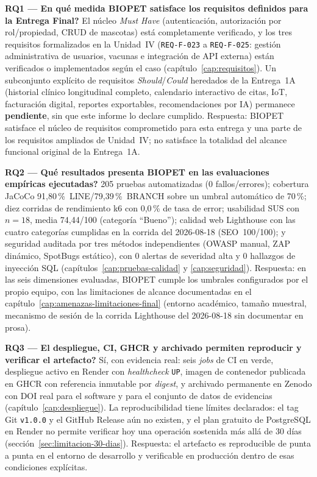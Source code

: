 \textbf{RQ1 --- \textquestiondown En qu\'e medida BIOPET satisface los
requisitos definidos para la Entrega Final?} El n\'ucleo \emph{Must Have}
(autenticaci\'on, autorizaci\'on por rol/propiedad, CRUD de mascotas) est\'a
completamente verificado, y los tres requisitos formalizados en la
Unidad~IV (\texttt{REQ-F-023} a \texttt{REQ-F-025}: gesti\'on
administrativa de usuarios, vacunas e integraci\'on de API externa) est\'an
verificados o implementados seg\'un el caso (cap\'itulo~\ref{cap:requisitos}). Un
subconjunto expl\'icito de requisitos \emph{Should}/\emph{Could} heredados
de la Entrega~1A (historial cl\'inico longitudinal completo, calendario
interactivo de citas, IoT, facturaci\'on digital, reportes exportables,
recomendaciones por IA) permanece \textbf{pendiente}, sin que este informe
lo declare cumplido. Respuesta: BIOPET satisface el n\'ucleo de requisitos
comprometido para esta entrega y una parte de los requisitos ampliados de
Unidad~IV; no satisface la totalidad del alcance funcional original de la
Entrega~1A.

\textbf{RQ2 --- \textquestiondown Qu\'e resultados presenta BIOPET en las
evaluaciones emp\'iricas ejecutadas?} 205 pruebas automatizadas (0
fallos/errores); cobertura JaCoCo 91{,}80\,\%~LINE/79{,}39\,\%~BRANCH sobre
un umbral autom\'atico de 70\,\%; diez corridas de rendimiento k6 con
0{,}0\,\% de tasa de error; usabilidad SUS con $n=18$, media 74{,}44/100
(categor\'ia ``Bueno''); calidad web Lighthouse con las cuatro categor\'ias
cumplidas en la corrida del 2026-08-18 (SEO~100/100); y seguridad auditada
por tres m\'etodos independientes (OWASP manual, ZAP din\'amico, SpotBugs
est\'atico), con 0 alertas de severidad alta y 0 hallazgos de inyecci\'on
SQL (cap\'itulos~\ref{cap:pruebas-calidad} y \ref{cap:seguridad}). Respuesta:
en las seis dimensiones evaluadas, BIOPET cumple los umbrales configurados
por el propio equipo, con las limitaciones de alcance documentadas en el
cap\'itulo~\ref{cap:amenazas-limitaciones-final} (entorno acad\'emico,
tama\~no muestral, mecanismo de sesi\'on de la corrida Lighthouse del
2026-08-18 sin documentar en prosa).

\textbf{RQ3 --- \textquestiondown El despliegue, CI, GHCR y archivado
permiten reproducir y verificar el artefacto?} S\'i, con evidencia real:
seis \emph{jobs} de CI en verde, despliegue activo en Render con
\emph{healthcheck} \texttt{UP}, imagen de contenedor publicada en GHCR con
referencia inmutable por \emph{digest}, y archivado permanente en Zenodo
con DOI real para el software y para el conjunto de datos de evidencias
(cap\'itulo~\ref{cap:despliegue}). La reproducibilidad tiene l\'imites
declarados: el tag Git \texttt{v1.0.0} y el GitHub Release a\'un no existen,
y el plan gratuito de PostgreSQL en Render no permite verificar hoy una
operaci\'on sostenida m\'as all\'a de 30 d\'ias
(secci\'on~\ref{sec:limitacion-30-dias}). Respuesta: el artefacto es
reproducible de punta a punta en el entorno de desarrollo y verificable en
producci\'on dentro de esas condiciones expl\'icitas.
